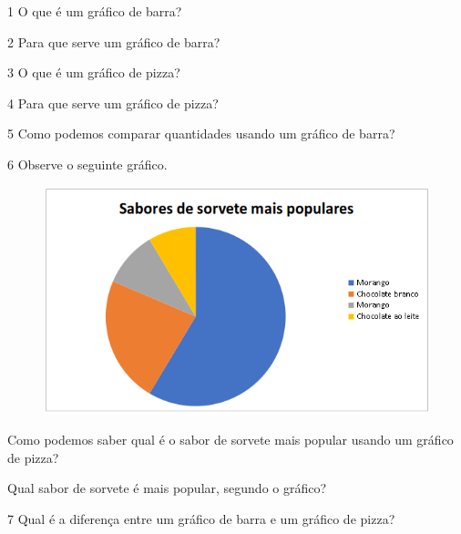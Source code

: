 
\num{1} O que é um gráfico de barra?



\num{2} Para que serve um gráfico de barra?



\num{3} O que é um gráfico de pizza?


\num{4} Para que serve um gráfico de pizza?



\num{5} Como podemos comparar quantidades usando um gráfico de barra?


\num{6} Observe o seguinte gráfico.

\begin{figure}[htpb!]
\includegraphics[width=.5\textwidth]{./imgs/chart3.png}
\end{figure}

\begin{escolha}
\item Como podemos saber qual é o sabor de sorvete mais popular usando um
gráfico de pizza?



\item Qual sabor de sorvete é mais popular, segundo o gráfico?

\end{escolha}


\num{7} Qual é a diferença entre um gráfico de barra e um gráfico de pizza?



